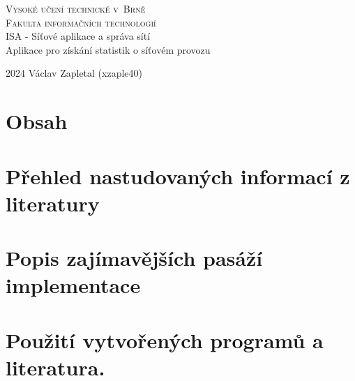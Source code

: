 \documentclass[a4paper,11pt]{article}
\theoremstyle{definition}
\begin{document}
\begin{titlepage}
    \begin{center}
        \Huge
        \textsc{Vysoké učení technické v~Brně\\
        \huge Fakulta informačních technologií}\\
        \LARGE ISA - Síťové aplikace a správa sítí\\
        Aplikace pro získání statistik o síťovém provozu
    \end{center}
    {\Large 2024 \hfill Václav Zapletal (xzaple40)}
\end{titlepage}


\section{Obsah}

\section{Přehled nastudovaných informací z literatury}

\section{Popis zajímavějších pasáží implementace}


\section{Použití vytvořených programů a literatura.}
\end{document}
